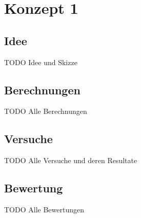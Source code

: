 \section{Konzept 1}

\subsection{Idee}
TODO Idee und Skizze

\subsection{Berechnungen}
TODO Alle Berechnungen

\subsection{Versuche}
TODO Alle Versuche und deren Resultate

\subsection{Bewertung}
TODO Alle Bewertungen